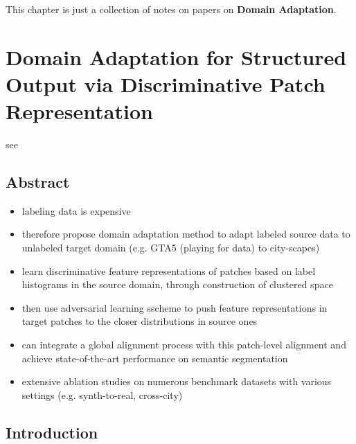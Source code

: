 \documentclass[]{article}
\title{}
\author{}
\begin{document}
	
	\maketitle

This chapter is just a collection of notes on papers on \textbf{Domain Adaptation}.


\section{Domain Adaptation for Structured Output via Discriminative Patch Representation}

see \cite{Tsai2019DomainAF}

\subsection{Abstract}
\begin{itemize}
	\item labeling data is expensive
	\item therefore propose domain adaptation method to adapt labeled source data to unlabeled target domain (e.g. GTA5 (playing for data) to city-scapes)
	\item learn discriminative feature representations of patches based on label histograms in the source domain, through construction of clustered space
	\item then use adversarial learning sscheme to push feature representations in target patches to the closer distributions in source ones
	\item can integrate a global alignment process with this patch-level alignment and achieve state-of-the-art performance on semantic segmentation
	\item extensive ablation studies on numerous benchmark datasets with various settings (e.g. synth-to-real, cross-city)
\end{itemize}

\subsection{Introduction}
\end{document}
